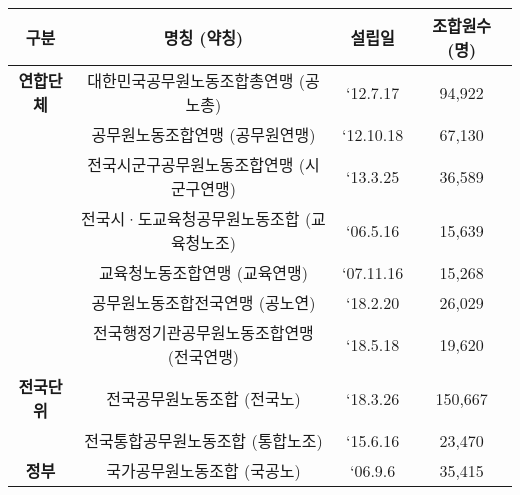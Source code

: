 \begin{tabular}{c|c|c|c}
\toprule
\textbf{구분} & \textbf{명칭 (약칭)} & \textbf{설립일} & \textbf{조합원수 (명)} \\
\midrule
\textbf{연합단체} & 대한민국공무원노동조합총연맹 (공노총) & ‘12.7.17 & 94,922 \\
 & 공무원노동조합연맹 (공무원연맹) & ‘12.10.18 & 67,130 \\
 & 전국시군구공무원노동조합연맹 (시군구연맹) & ‘13.3.25 & 36,589 \\
 & 전국시·도교육청공무원노동조합 (교육청노조) & ‘06.5.16 & 15,639 \\
 & 교육청노동조합연맹 (교육연맹) & ‘07.11.16 & 15,268 \\
 & 공무원노동조합전국연맹 (공노연) & ‘18.2.20 & 26,029 \\
 & 전국행정기관공무원노동조합연맹 (전국연맹) & ‘18.5.18 & 19,620 \\
\midrule
\textbf{전국단위} & 전국공무원노동조합 (전국노) & ‘18.3.26 & 150,667 \\
 & 전국통합공무원노동조합 (통합노조) & ‘15.6.16 & 23,470 \\
\midrule
\textbf{정부} & 국가공무원노동조합 (국공노) & ‘06.9.6 & 35,415 \\
\bottomrule
\end{tabular}
